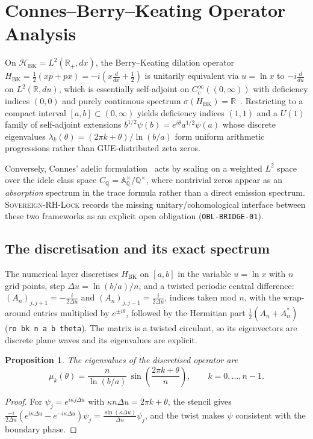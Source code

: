 \documentclass[11pt,letterpaper]{article}
\newtheorem{proposition}{Proposition}
\newcommand{\code}[1]{\texttt{#1}}
\begin{document}
\section{Connes--Berry--Keating Operator Analysis}
\label{sec:bk}

On $\mathcal{H}_{\mathrm{BK}} = L^2(\mathbb{R}_+, dx)$, the Berry--Keating dilation operator $H_{\mathrm{BK}} = \frac{1}{2}(xp + px) = -i(x\frac{d}{dx} + \frac{1}{2})$ is unitarily equivalent via $u = \ln x$ to $-i\frac{d}{du}$ on $L^2(\mathbb{R}, du)$, which is essentially self-adjoint on $C_c^\infty((0,\infty))$ with deficiency indices $(0,0)$ and purely continuous spectrum $\sigma(H_{\mathrm{BK}}) = \mathbb{R}$~\cite{berry1999}. Restricting to a compact interval $[a,b] \subset (0,\infty)$ yields deficiency indices $(1,1)$ and a $U(1)$ family of self-adjoint extensions $b^{1/2}\psi(b) = e^{i\theta}a^{1/2}\psi(a)$ whose discrete eigenvalues $\lambda_k(\theta) = (2\pi k + \theta)/\ln(b/a)$ form uniform arithmetic progressions rather than GUE-distributed zeta zeros.

Conversely, Connes' adelic formulation~\cite{connes1999} acts by scaling on a weighted $L^2$ space over the idele class space $C_\mathbb{Q} = \mathbb{A}_\mathbb{Q}^\times / \mathbb{Q}^\times$, where nontrivial zeros appear as an \emph{absorption} spectrum in the trace formula rather than a direct emission spectrum. \textsc{Sovereign-RH-Lock} records the missing unitary/cohomological interface between these two frameworks as an explicit open obligation (\texttt{OBL-BRIDGE-01}).

\subsection{The discretisation and its exact spectrum}

The numerical layer discretises $H_{\mathrm{BK}}$ on $[a,b]$ in the variable $u=\ln x$ with $n$ grid points, step $\Delta u = \ln(b/a)/n$, and a twisted periodic central difference: $(A_n)_{j,j+1} = -\frac{i}{2\Delta u}$ and $(A_n)_{j,j-1} = \frac{i}{2\Delta u}$, indices taken mod $n$, with the wrap-around entries multiplied by $e^{\pm i\theta}$, followed by the Hermitian part $\frac12(A_n+A_n^*)$ (\code{ro bk n a b theta}). The matrix is a twisted circulant, so its eigenvectors are discrete plane waves and its eigenvalues are explicit.

\begin{proposition}
\label{prop:bk}
The eigenvalues of the discretised operator are
\begin{equation}
\label{eq:bkspec}
\mu_k(\theta) = \frac{n}{\ln(b/a)}\,\sin\!\left(\frac{2\pi k + \theta}{n}\right), \qquad k = 0,\dots,n-1 .
\end{equation}
\end{proposition}
\begin{proof}
For $\psi_j = e^{i\kappa j\Delta u}$ with $\kappa n\Delta u = 2\pi k + \theta$, the stencil gives $\frac{-i}{2\Delta u}(e^{i\kappa\Delta u} - e^{-i\kappa\Delta u})\psi_j = \frac{\sin(\kappa\Delta u)}{\Delta u}\psi_j$, and the twist makes $\psi$ consistent with the boundary phase.
\end{proof}
\end{document}
